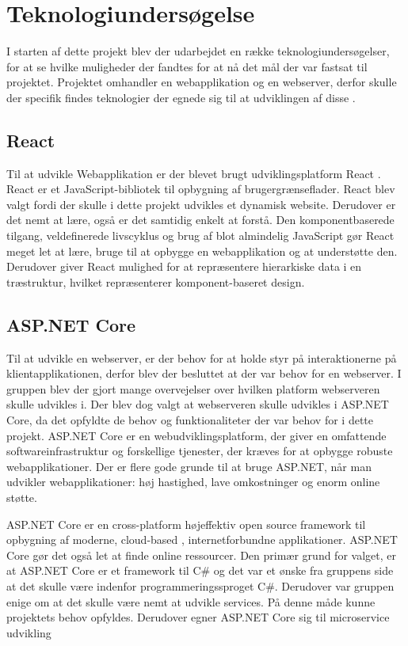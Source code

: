 \chapter{Teknologiundersøgelse}

I starten af dette projekt blev der udarbejdet en række teknologiundersøgelser, for at se hvilke muligheder der fandtes for at nå det mål der var fastsat til projektet. Projektet omhandler en webapplikation og en webserver, derfor skulle der specifik findes teknologier der egnede sig til at udviklingen af disse \cite{Research}.    

\section{React}

Til at udvikle Webapplikation er der blevet brugt udviklingsplatform React \cite[React]{converge-terms}. React er et JavaScript-bibliotek til opbygning af brugergrænseflader. React blev valgt fordi der skulle i dette projekt udvikles et dynamisk website. Derudover er det nemt at lære, også er det samtidig enkelt at forstå. Den komponentbaserede tilgang, veldefinerede livscyklus og brug af blot almindelig JavaScript gør React meget let at lære, bruge til at opbygge en webapplikation og at understøtte den. Derudover giver React mulighed for at repræsentere hierarkiske data i en træstruktur, hvilket repræsenterer komponent-baseret design.

\section{ASP.NET Core}

Til at udvikle en webserver, er der behov for at holde styr på interaktionerne på klientapplikationen, derfor blev der besluttet at der var behov for en webserver. I gruppen blev der gjort mange overvejelser over hvilken platform webserveren skulle udvikles i. Der blev dog valgt at webserveren skulle udvikles i ASP.NET Core, da det opfyldte de behov og funktionaliteter der var behov for i dette projekt. ASP.NET Core er en webudviklingsplatform, der giver en omfattende softwareinfrastruktur \cite[Softwareinfrastruktur]{converge-terms} og forskellige tjenester, der kræves for at opbygge robuste webapplikationer. Der er flere gode grunde til at bruge ASP.NET, når man udvikler webapplikationer: høj hastighed, lave omkostninger og enorm online støtte. 

ASP.NET Core er en cross-platform højeffektiv open source framework til opbygning af moderne, cloud-based \cite[Cloud Based]{converge-terms}, internetforbundne applikationer. ASP.NET Core gør det også let at finde online ressourcer. Den primær grund for valget, er at ASP.NET Core er et framework til C\# og det var et ønske fra gruppens side at det skulle være indenfor programmeringssproget C\#. Derudover var gruppen enige om at det skulle være nemt at udvikle services. På denne måde kunne projektets behov opfyldes. Derudover egner ASP.NET Core sig til microservice \cite[Microservice]{converge-terms} udvikling


